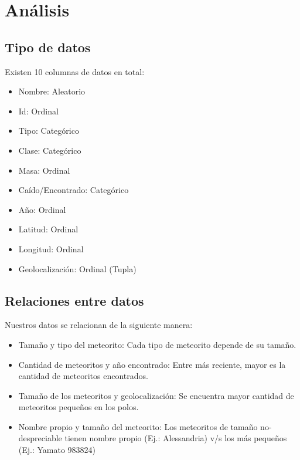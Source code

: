\documentclass[letterpaper,10pt]{article}
\begin{document}
	\tableofcontents

	\newpage

	\section{Análisis}

	\subsection{Tipo de datos}

	Existen 10 columnas de datos en total:

	\begin{itemize}
		\item Nombre: Aleatorio
		\item Id: Ordinal
		\item Tipo: Categórico
		\item Clase: Categórico
		\item Masa: Ordinal

		\item Caído/Encontrado: Categórico
		\item Año: Ordinal
		\item Latitud: Ordinal
		\item Longitud: Ordinal
		\item Geolocalización: Ordinal (Tupla)
	\end{itemize}

	\subsection{Relaciones entre datos}

	Nuestros datos se relacionan de la siguiente manera:

	\begin{itemize}
		\item Tamaño y tipo del meteorito: Cada tipo de meteorito depende de su tamaño.
		\item Cantidad de meteoritos y año encontrado: Entre más reciente, mayor es la cantidad de meteoritos encontrados.
		\item Tamaño de los meteoritos y geolocalización: Se encuentra mayor cantidad de meteoritos pequeños en los polos.
		\item Nombre propio y tamaño del meteorito: Los meteoritos de tamaño no-despreciable tienen nombre propio (Ej.: Alessandria) v/s los más pequeños (Ej.: Yamato 983824)
	\end{itemize}
\end{document}

